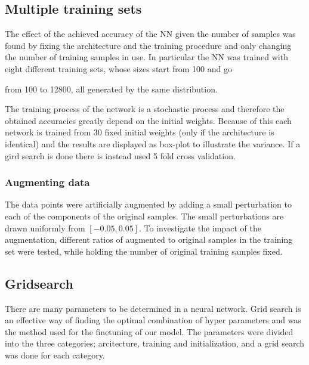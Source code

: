\documentclass[prl,twocolumn]{revtex4-1}
\begin{document}
\subsection{Multiple training sets}

The effect of the achieved accuracy of the NN given the number of samples was found by fixing the architecture and the training procedure and only changing the number of training samples in use. In particular the NN was trained with eight different training sets, whose sizes start from 100 and go 

from 100 to 12800, all generated by the same distribution.


The training process of the network is a stochastic process and therefore the obtained accuracies greatly depend on the initial weights. Because of this each network is trained from 30 fixed initial weights (only if the architecture is identical) and the results are displayed as box-plot to illustrate the variance. If a gird search is done there is instead used 5 fold cross validation.

\subsubsection{Augmenting data}
The data points were artificially augmented by adding a small perturbation to each of the components of the original samples. The small perturbations are drawn uniformly from $[-0.05,0.05]$. To investigate the impact of the augmentation, different ratios of augmented to original samples in the training set were tested, while holding the number of original training samples fixed.\\


\subsection{Gridsearch}
There are many parameters to be determined in a neural network. Grid search is an effective way of finding the optimal combination of hyper parameters and was the method used for the finetuning of our model. The parameters were divided into the three categories; arcitecture, training and initialization, and a grid search was done for each category.
\end{document}
